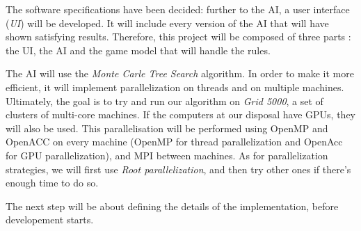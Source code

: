 The software specifications have been decided: further to the AI, a user interface (\emph{UI}) will be developed.
It will include every version of the AI that will have shown satisfying results.
Therefore, this project will be composed of three parts : the UI, the AI and the game model that will handle the rules.

The AI will use the \emph{Monte Carle Tree Search} algorithm.
In order to make it more efficient, it will implement parallelization on threads and on multiple machines.
Ultimately, the goal is to try and run our algorithm on \emph{Grid 5000}, a set of clusters of multi-core machines.
If the computers at our disposal have GPUs, they will also be used.
This parallelisation will be performed using OpenMP and OpenACC on every machine (OpenMP for thread parallelization and OpenAcc for GPU parallelization), and MPI between machines.
As for parallelization strategies, we will first use \emph{Root parallelization}, and then try other ones if there's enough time to do so.

The next step will be about defining the details of the implementation, before developement starts.